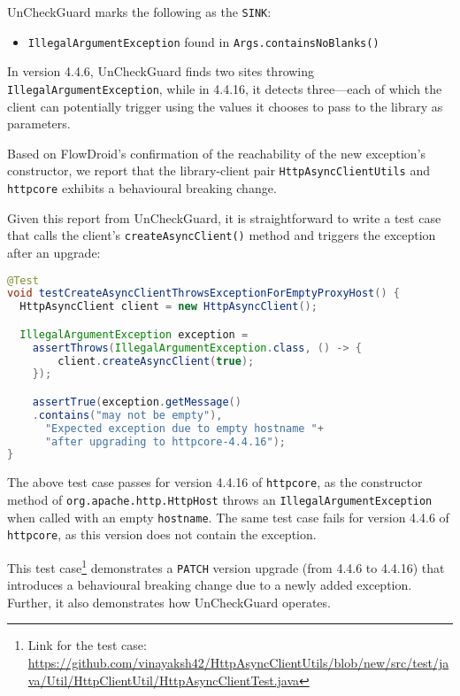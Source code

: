 UnCheckGuard marks the following as the \texttt{SINK}:
\begin{itemize}
  \item \texttt{IllegalArgumentException} found in \texttt{Args.containsNoBlanks()}
\end{itemize}

In version 4.4.6, UnCheckGuard finds two sites throwing \texttt{IllegalArgumentException}, while in 4.4.16, it detects three—each of which the client can potentially trigger using the values it chooses to pass to the library as parameters.

Based on FlowDroid's confirmation of the reachability of the new exception's constructor, we report that the library-client pair \texttt{HttpAsyncClientUtils} and \texttt{httpcore} exhibits a behavioural breaking change.

Given this report from UnCheckGuard, it is straightforward to write a test case that calls the client's \texttt{createAsyncClient()} method
and triggers the exception after an upgrade:
\begin{lstlisting}[language=Java]
@Test
void testCreateAsyncClientThrowsExceptionForEmptyProxyHost() {
  HttpAsyncClient client = new HttpAsyncClient();

  IllegalArgumentException exception =
    assertThrows(IllegalArgumentException.class, () -> {
        client.createAsyncClient(true);
    });

    assertTrue(exception.getMessage()
    .contains("may not be empty"),
      "Expected exception due to empty hostname "+
      "after upgrading to httpcore-4.4.16");
}
\end{lstlisting}

The above test case passes for version 4.4.16 of \texttt{httpcore}, as the constructor method of \texttt{org.apache.http.HttpHost} throws an \texttt{IllegalArgumentException} when called with an empty \texttt{hostname}. The same test case fails for version 4.4.6 of \texttt{httpcore}, as this version does not contain the exception.

This test case\footnote{Link for the test case: \url{https://github.com/vinayaksh42/HttpAsyncClientUtils/blob/new/src/test/java/Util/HttpClientUtil/HttpAsyncClientTest.java}} demonstrates a \texttt{PATCH} version upgrade (from 4.4.6 to 4.4.16) that introduces a behavioural breaking change due to a newly added exception. Further, it also demonstrates how UnCheckGuard operates.